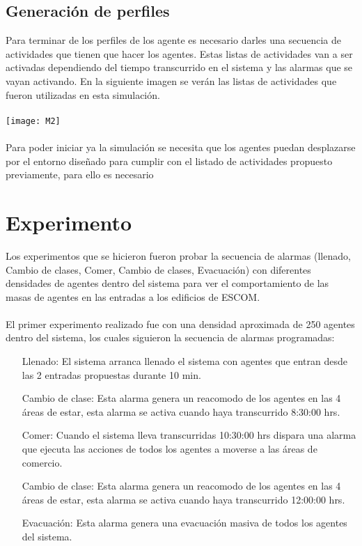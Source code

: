 \documentclass[a4paper,10pt]{article}
\begin{document}
\subsection{Generaci\'on de perfiles}

Para terminar de los perfiles de los agente es necesario darles una secuencia de actividades que tienen que hacer los agentes. Estas listas de actividades van a ser activadas dependiendo del tiempo transcurrido en el sistema y las alarmas que se vayan activando. En la siguiente imagen se ver\'an las listas de actividades que fueron utilizadas en esta simulaci\'on.
\\ \\
\texttt{[image: M2]}
\\ \\
Para poder iniciar ya la simulaci\'on se necesita que los agentes puedan desplazarse por el entorno dise\~nado para cumplir con el listado de actividades propuesto previamente, para ello es necesario

\section{Experimento}

Los experimentos que se hicieron fueron probar la secuencia de alarmas (llenado, Cambio de clases, Comer, Cambio de clases, Evacuaci\'on) con diferentes densidades de agentes dentro del sistema para ver el comportamiento de las masas de agentes en las entradas a los edificios de ESCOM.
\\ \\
El primer experimento realizado fue con una densidad aproximada de 250 agentes dentro del sistema, los cuales siguieron la secuencia de alarmas programadas:

\begin{enumerate}
 \item[Llenado:]El sistema arranca llenado el sistema con agentes que entran  desde las 2 entradas propuestas durante 10 min.

 \item[Cambio de clase:]Esta alarma genera un reacomodo de los agentes en las 4 \'areas de estar, esta alarma se activa cuando haya transcurrido 8:30:00 hrs.

 \item[Comer:]Cuando el sistema lleva transcurridas 10:30:00 hrs dispara una alarma que ejecuta las acciones de todos los agentes a moverse a las \'areas de comercio.

 \item[Cambio de clase:]Esta alarma genera un reacomodo de los agentes en las 4 \'areas de estar, esta alarma se activa cuando haya transcurrido 12:00:00 hrs.

 \item[Evacuaci\'on:]Esta alarma genera una evacuaci\'on masiva de todos los agentes del sistema.

\end{enumerate}
\end{document}
